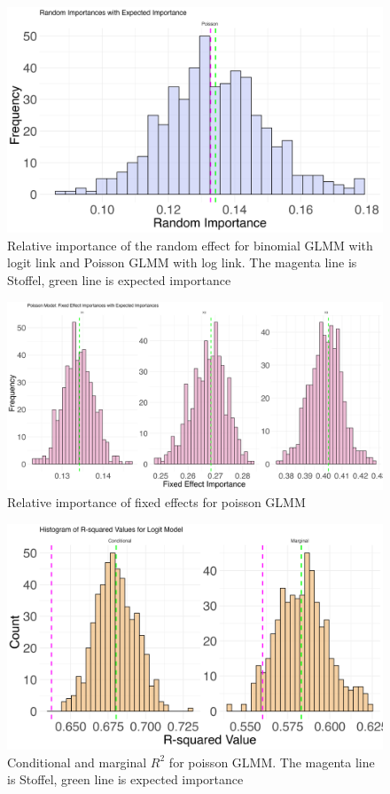 \begin{figure}[H]
  \centering
    \includegraphics[width=0.7\linewidth]{Figures/Simulation study/Random_poisson.png}
    \caption{Relative importance of the random effect for binomial GLMM with logit link and Poisson GLMM with log link. The magenta line is Stoffel, green line is expected importance}
    \label{fig:relimp_random_poisson}
\end{figure}

\begin{figure}[H]
  \centering
    \includegraphics[width=0.7\linewidth]{Figures/Simulation study/Fixed_poisson.png}
    \caption{Relative importance of fixed effects for poisson GLMM}
    \label{fig:relimp_poisson_fixed}
\end{figure}
\begin{figure}[H]\ContinuedFloat
  \centering
  \includegraphics[width=0.7\linewidth]{Figures/Simulation study/R2_logit.png}
  \caption{Conditional and marginal $R^2$ for poisson GLMM. The magenta line is Stoffel, green line is expected importance}
    \label{fig:relimp_poisson_R2}
\end{figure}

